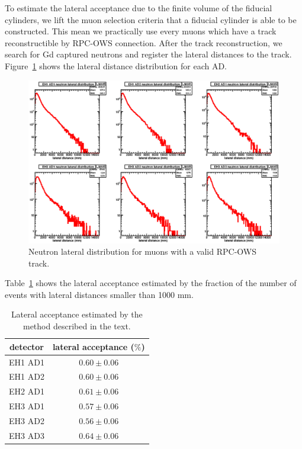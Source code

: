 To estimate the lateral acceptance due to the finite volume of the fiducial cylinders, we lift the muon selection criteria that a fiducial cylinder is able to be constructed. This mean we practically use every muons which have a track reconstructible by RPC-OWS connection. After the track reconstruction, we search for Gd captured neutrons and register the lateral distances to the track. Figure~\ref{fig:lateral_distance_no_cylinder} shows the lateral distance distribution for each AD.
\begin{figure}[ht]
	\centering
	\includegraphics[width=\textwidth]{figures/chap7/lateral_distance_no_cylinder.eps}
	\caption{Neutron lateral distribution for muons with a valid RPC-OWS track.}
	\label{fig:lateral_distance_no_cylinder}
\end{figure}
Table~\ref{tab:lateral_acceptance} shows the lateral acceptance estimated by the fraction of the number of events with lateral distances smaller than 1000 mm.
\begin{table}
	\centering
	\begin{tabular}{|c|c|}
		\hline
		detector & lateral acceptance ($\%$) \\
		\hline
		EH1 AD1 & $0.60\pm 0.06$ \\
		\hline
		EH1 AD2 & $0.60\pm 0.06$ \\
		\hline
		EH2 AD1 & $0.61\pm 0.06$ \\
		\hline
		EH3 AD1 & $0.57\pm 0.06$ \\
		\hline
		EH3 AD2 & $0.56\pm 0.06$ \\
		\hline
		EH3 AD3 & $0.64\pm 0.06$ \\
		\hline
	\end{tabular}
	\caption{Lateral acceptance estimated by the method described in the text.}
	\label{tab:lateral_acceptance}
\end{table}


